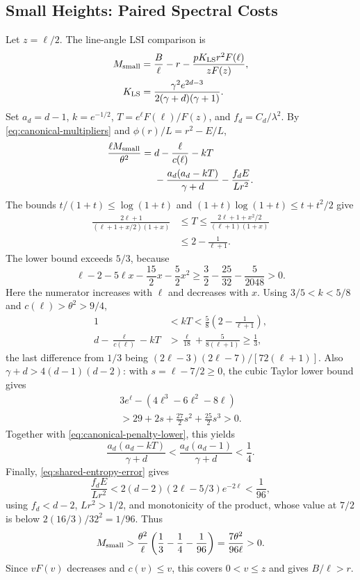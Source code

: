 \subsection{Small Heights: Paired Spectral Costs}
\label{app:manual-small}

Let \(z=\ell/2\). The line-angle LSI comparison is
\begin{align*}
 M_{\rm small}&=\frac B\ell-r
       -\frac{pK_{\rm LS}r^2F(\ell)}{zF(z)},\\
 K_{\rm LS}&=\frac{\gamma^2 e^{2d-3}}{2(\gamma+d)(\gamma+1)}.
\end{align*}
Set \(a_d=d-1\), \(k=e^{-1/2}\),
\(T=e^\ell F(\ell)/F(z)\), and \(f_d=C_d/\lambda^2\).
By \eqref{eq:canonical-multipliers} and \(\phi(r)/L=r^2-E/L\),
\begin{equation}
 \begin{split}
 \frac{\ell M_{\rm small}}{\theta^2}
 ={}&d-\frac\ell{c(\ell)}-kT\\
 &-\frac{a_d(a_d-kT)}{\gamma+d}-\frac{f_dE}{Lr^2}.
 \end{split}
 \label{eq:canonical-small-pairing}
\end{equation}
The bounds \(t/(1+t)\le\log(1+t)\) and
\((1+t)\log(1+t)\le t+t^2/2\) give
\begin{align*}
 \frac{2\ell+1}{(\ell+1+x/2)(1+x)}
 &\le T\le\frac{2\ell+1+x^2/2}{(\ell+1)(1+x)}\\
 &\le2-\frac1{\ell+1}.
\end{align*}
The lower bound exceeds \(5/3\), because
\[
 \ell-2-5\ell x-\frac{15}2x-\frac52x^2
 \ge\frac32-\frac{25}{32}-\frac5{2048}>0.
\]
Here the numerator increases with \(\ell\) and decreases with \(x\).
Using \(3/5<k<5/8\) and \(c(\ell)>\theta^2>9/4\),
\begin{align*}
 1&<kT<\frac58\left(2-\frac1{\ell+1}\right),\\
 d-\frac\ell{c(\ell)}-kT
 &>\frac\ell{18}+\frac5{8(\ell+1)}\ge\frac13,
\end{align*}
the last difference from \(1/3\) being
\((2\ell-3)(2\ell-7)/[72(\ell+1)]\).
Also \(\gamma+d>4(d-1)(d-2)\): with \(s=\ell-7/2\ge0\),
the cubic Taylor lower bound gives
\begin{gather*}
 3e^\ell-(4\ell^3-6\ell^2-8\ell)\\
 >29+2s+\frac{27}2s^2+\frac{25}2s^3>0.
\end{gather*}
Together with \eqref{eq:canonical-penalty-lower}, this yields
\[
 \frac{a_d(a_d-kT)}{\gamma+d}
 <\frac{a_d(a_d-1)}{\gamma+d}<\frac14.
\]
Finally, \eqref{eq:shared-entropy-error} gives
\[
 \frac{f_dE}{Lr^2}<2(d-2)(2\ell-5/3)e^{-2\ell}<\frac1{96},
\]
using \(f_d<d-2\), \(Lr^2>1/2\), and monotonicity of the
product, whose value at \(7/2\) is below \(2(16/3)/32^2=1/96\).
Thus
\[
 M_{\rm small}>\frac{\theta^2}{\ell}
                      \left(\frac13-\frac14-\frac1{96}\right)
                =\frac{7\theta^2}{96\ell}>0.
\]
Since \(vF(v)\) decreases and \(c(v)\le v\), this covers
\(0<v\le z\) and gives \(B/\ell>r\).

